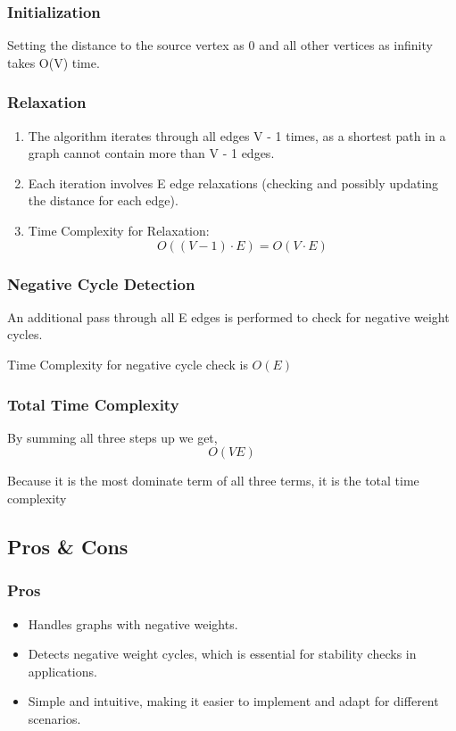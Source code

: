 \documentclass[12pt]{article}
\begin{document}
\subsubsection{Initialization}
Setting the distance to the source vertex as 0 and all other vertices as infinity takes O(V) time.

\subsubsection{Relaxation}
\begin{enumerate}
	\item The algorithm iterates through all edges V - 1 times, as a shortest path in a graph cannot contain more than V - 1 edges.
	\item Each iteration involves E edge relaxations (checking and possibly updating the distance for each edge).
	\item Time Complexity for Relaxation:
	\[
		O((V - 1)\cdot E)=O(V\cdot E)
	\]
\end{enumerate}

\subsubsection{Negative Cycle Detection}
An additional pass through all E edges is performed to check for negative weight cycles. \par 

Time Complexity for negative cycle check is \( O(E) \)

\subsubsection{Total Time Complexity}
By summing all three steps up we get,
\[ O(VE) \]

Because it is the most dominate term of all three terms, it is the total time complexity

\subsection{Pros \& Cons}
\subsubsection{Pros}
\begin{itemize}
	\item Handles graphs with negative weights.
	\item Detects negative weight cycles, which is essential for stability checks in applications. 
	\item Simple and intuitive, making it easier to implement and adapt for different scenarios. 
\end{itemize}
\end{document}
